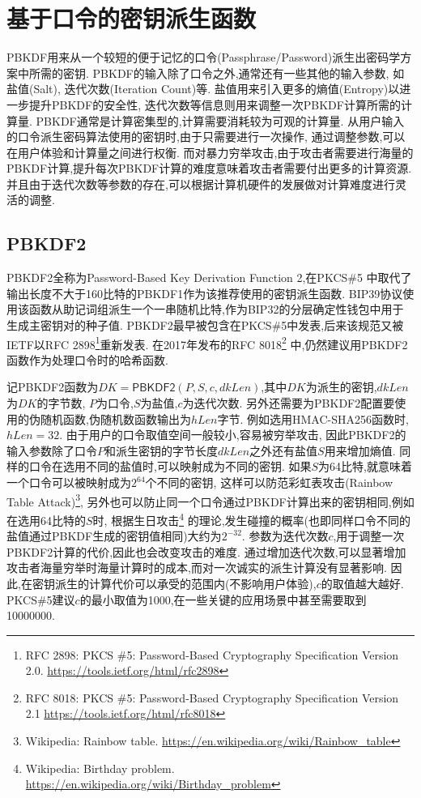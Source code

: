 
\section{基于口令的密钥派生函数}

PBKDF用来从一个较短的便于记忆的口令(Passphrase/Password)派生出密码学方案中所需的密钥.
PBKDF的输入除了口令之外,通常还有一些其他的输入参数, 如盐值(Salt), 迭代次数(Iteration Count)等.
盐值用来引入更多的熵值(Entropy)以进一步提升PBKDF的安全性, 迭代次数等信息则用来调整一次PBKDF计算所需的计算量.
PBKDF通常是计算密集型的,计算需要消耗较为可观的计算量.
从用户输入的口令派生密码算法使用的密钥时,由于只需要进行一次操作,
通过调整参数,可以在用户体验和计算量之间进行权衡.
而对暴力穷举攻击,由于攻击者需要进行海量的PBKDF计算,提升每次PBKDF计算的难度意味着攻击者需要付出更多的计算资源.
并且由于迭代次数等参数的存在,可以根据计算机硬件的发展做对计算难度进行灵活的调整.

\subsection{PBKDF2}
PBKDF2全称为Password-Based Key Derivation Function 2,在PKCS\#5
中取代了输出长度不大于160比特的PBKDF1作为该推荐使用的密钥派生函数.
BIP39协议使用该函数从助记词组派生一个一串随机比特,作为BIP32的分层确定性钱包中用于生成主密钥对的种子值.
PBKDF2最早被包含在PKCS\#5中发表,后来该规范又被IETF以RFC 
2898\footnote{
RFC 2898: PKCS \#5: Password-Based Cryptography Specification Version 2.0.
\url{https://tools.ietf.org/html/rfc2898}}重新发表.
在2017年发布的RFC 8018\footnote{
RFC 8018: PKCS \#5: Password-Based Cryptography Specification Version 2.1 \url{https://tools.ietf.org/html/rfc8018}}
中,仍然建议用PBKDF2函数作为处理口令时的哈希函数.

记PBKDF2函数为$DK = \textsf{PBKDF2}(P, S, c, dkLen)$,其中$DK$为派生的密钥,$dkLen$为$DK$的字节数,
$P$为口令,$S$为盐值,$c$为迭代次数.
另外还需要为\textsf{PBKDF2}配置要使用的伪随机函数,伪随机数函数输出为$hLen$字节.
例如选用\textsf{HMAC-SHA256}函数时, $hLen = 32$.
由于用户的口令取值空间一般较小,容易被穷举攻击,
因此PBKDF2的输入参数除了口令$P$和派生密钥的字节长度$dkLen$之外还有盐值$S$用来增加熵值.
同样的口令在选用不同的盐值时,可以映射成为不同的密钥.
如果$S$为64比特,就意味着一个口令可以被映射成为$2^{64}$个不同的密钥,
这样可以防范彩虹表攻击(Rainbow Table Attack)\footnote{
Wikipedia: Rainbow table. \url{https://en.wikipedia.org/wiki/Rainbow_table}},
另外也可以防止同一个口令通过PBKDF计算出来的密钥相同,例如在选用64比特的$S$时,
根据生日攻击\footnote{
Wikipedia: Birthday problem. \url{https://en.wikipedia.org/wiki/Birthday_problem}}
的理论,发生碰撞的概率(也即同样口令不同的盐值通过PBKDF生成的密钥值相同)大约为$2^{-32}$.
参数为迭代次数$c$,用于调整一次\textsf{PBKDF2}计算的代价,因此也会改变攻击的难度.
通过增加迭代次数,可以显著增加攻击者海量穷举时海量计算时的成本,而对一次诚实的派生计算没有显著影响.
因此,在密钥派生的计算代价可以承受的范围内(不影响用户体验),$c$的取值越大越好.
PKCS\#5建议$c$的最小取值为1000,在一些关键的应用场景中甚至需要取到10000000.


